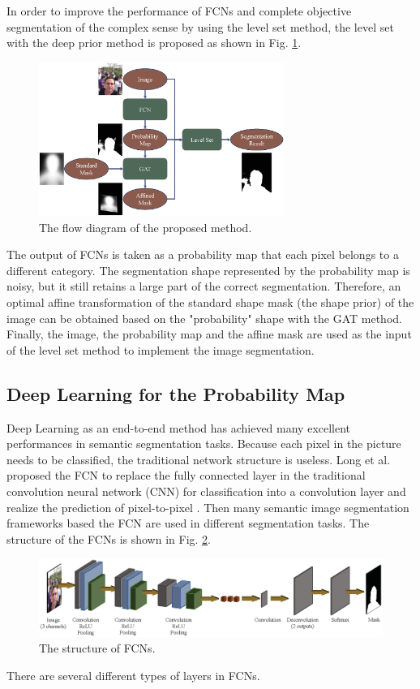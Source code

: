 In order to improve the performance of FCNs and complete objective segmentation of the complex sense by using the level set method, the level set with the deep prior method is proposed as shown in Fig. \ref{fig: Flow diagram}.
\begin{figure}[h]
    \centering
    \includegraphics[width = 8cm]{figs/Flow_Diag.eps}
    \caption{The flow diagram of the proposed method.}\label{fig: Flow diagram}
\end{figure}
The output of FCNs is taken as a probability map that each pixel belongs to a different category. The segmentation shape represented by the probability map is noisy, but it still retains a large part of the correct segmentation. Therefore, an optimal affine transformation of the standard shape mask (the shape prior) of the image can be obtained based on the "probability" shape with the GAT method. Finally, the image, the probability map and the affine mask are used as the input of the level set method to implement the image segmentation.

\subsection{Deep Learning for the Probability Map}\label{subsec: FCNs for the Probability Map}
Deep Learning as an end-to-end method has achieved many excellent performances in semantic segmentation tasks. Because each pixel in the picture needs to be classified, the traditional network structure is useless. Long et al. proposed the FCN to replace the fully connected layer in the traditional convolution neural network (CNN) for classification into a convolution layer and realize the prediction of pixel-to-pixel \cite{FCN-original:long2015fully}. Then many semantic image segmentation frameworks based the FCN are used in different segmentation tasks. The structure of the FCNs is shown in Fig. \ref{fig: The structure of FCNs}.
\begin{figure}[ht]
    \centering
    \includegraphics[width = 15cm]{figs/FCN.eps}
    \caption{The structure of FCNs.}\label{fig: The structure of FCNs}
\end{figure}
There are several different types of layers in FCNs.
